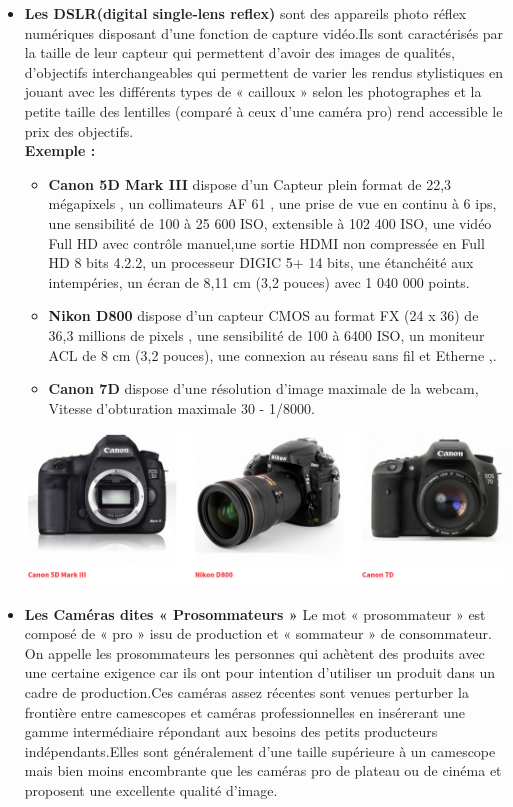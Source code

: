 \documentclass[12pt,a4paper]{report}
\begin{document}
\begin{itemize}
	\item \textbf{Les DSLR(digital single-lens reflex)} sont des appareils photo réflex numériques disposant d’une fonction de capture vidéo.Ils sont caractérisés par la taille de leur capteur qui permettent d'avoir des images de qualités, d’objectifs interchangeables qui permettent de varier les rendus stylistiques en jouant avec les différents types de « cailloux » selon les photographes et la petite taille des lentilles (comparé à ceux d’une caméra pro) rend accessible le prix des objectifs.\\
	
	\textbf{Exemple :\\}
	
	\begin{itemize}
		\item \textbf{Canon 5D Mark III} dispose d'un Capteur plein format de 22,3 mégapixels , un collimateurs AF 61 , une prise de vue en continu à 6 ips, une sensibilité de 100 à 25 600 ISO, extensible à 102 400 ISO, une vidéo Full HD avec contrôle manuel,une sortie HDMI non compressée en Full HD 8 bits 4.2.2, un processeur DIGIC 5+ 14 bits, une étanchéité aux intempéries, un écran de 8,11 cm (3,2 pouces) avec 1 040 000 points. \\
		\item \textbf{Nikon D800} dispose d'un capteur CMOS au format FX (24 x 36) de 36,3 millions de pixels , une sensibilité de 100 à 6400 ISO, un moniteur ACL de 8 cm (3,2 pouces), une connexion au réseau sans fil et Etherne ,.\\
		
		\item \textbf{Canon 7D} dispose d'une résolution d'image maximale de la webcam, Vitesse d'obturation maximale 30 - 1/8000. \\		 
	\end{itemize}
	\includegraphics[scale=0.38]{image/DSLR.png} \\
	
\item \textbf{Les Caméras dites « Prosommateurs »} Le mot « prosommateur » est composé de « pro » issu de production et « sommateur » de consommateur. On appelle les prosommateurs les personnes qui achètent des produits avec une certaine exigence car ils ont pour intention d’utiliser un produit dans un cadre de production.Ces caméras assez récentes sont venues perturber la frontière entre camescopes et caméras professionnelles en insérerant une gamme intermédiaire répondant aux besoins des petits producteurs indépendants.Elles sont généralement d’une taille supérieure à un camescope mais bien moins encombrante que les caméras pro de plateau ou de cinéma et proposent une excellente qualité d’image.



\end{itemize}
\end{document}
